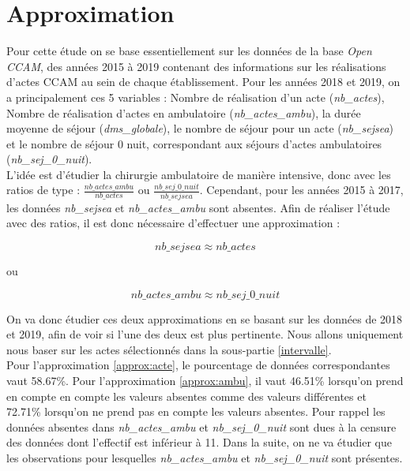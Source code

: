 \section{Approximation} \label{Approx}

Pour cette étude on se base essentiellement sur les données de la base \textit{Open CCAM}, des années 2015 à 2019 contenant des informations sur les réalisations d'actes CCAM au sein de chaque établissement. Pour les années 2018 et 2019, on a principalement ces 5 variables : Nombre de réalisation d'un acte (\textit{nb\_actes}), Nombre de réalisation d'actes en ambulatoire (\textit{nb\_actes\_ambu}), la durée moyenne de séjour (\textit{dms\_globale}), le nombre de séjour pour un acte (\textit{nb\_sejsea}) et le nombre de séjour 0 nuit, correspondant aux séjours d'actes ambulatoires (\textit{nb\_sej\_0\_nuit}). \\

L'idée est d'étudier la chirurgie ambulatoire de manière intensive, donc avec les ratios de type : $\frac{nb\_actes\_ambu}{nb\_actes}$ ou $\frac{nb\_sej\_0\_nuit}{nb\_sejsea}$. Cependant, pour les années 2015 à 2017, les données \textit{nb\_sejsea} et \textit{nb\_actes\_ambu} sont absentes. Afin de réaliser l'étude avec des ratios, il est donc nécessaire d'effectuer une approximation : 

\begin{equation}\label{approx:acte}
    nb\_sejsea \approx nb\_actes
\end{equation}

ou 

\begin{equation}\label{approx:ambu}
    nb\_actes\_ambu \approx nb\_sej\_0\_nuit
\end{equation}

\bigskip

On va donc étudier ces deux approximations en se basant sur les données de 2018 et 2019, afin de voir si l'une des deux est plus pertinente. Nous allons uniquement nous baser sur les actes sélectionnés dans la sous-partie \ref{intervalle}.\\

Pour l'approximation \ref{approx:acte}, le pourcentage de données correspondantes vaut 58.67\%. Pour l'approximation \ref{approx:ambu}, il vaut 46.51\% lorsqu'on prend en compte en compte les valeurs absentes comme des valeurs différentes et 72.71\% lorsqu'on ne prend pas en compte les valeurs absentes. Pour rappel les données absentes dans \textit{nb\_actes\_ambu} et \textit{nb\_sej\_0\_nuit} sont dues à la censure des données dont l'effectif est inférieur à 11. Dans la suite, on ne va étudier que les observations pour lesquelles \textit{nb\_actes\_ambu} et \textit{nb\_sej\_0\_nuit} sont présentes.

